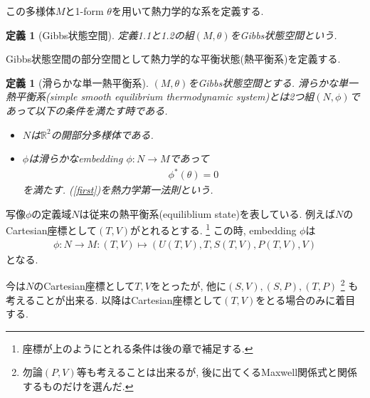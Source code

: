 \documentclass[a4paper,12pt]{ltjsarticle}
\theoremstyle{break}
\newtheorem{defn}[thm]{定義}
\newcommand{\mbr}{\mathbb{R}}
\newcommand{\mt}{\mapsto}
\numberwithin{equation}{section}
\begin{document}
この多様体$M$と1-form $\theta$を用いて熱力学的な系を定義する. 

\begin{defn}[Gibbs状態空間]
  定義1.1と1.2の組$(M,\theta)$をGibbs状態空間という. 
\end{defn}

Gibbs状態空間の部分空間として熱力学的な平衡状態(熱平衡系)を定義する. 

\begin{defn}[滑らかな単一熱平衡系]
  $(M,\theta)$をGibbs状態空間とする. 
  滑らかな単一熱平衡系(simple smooth equilibrium thermodynamic system)とは2つ組$(N,\phi)$であって以下の条件を満たす時である. 
  \begin{itemize}
    \item $N$は$\mbr^2$の開部分多様体である. 
    \item $\phi$は滑らかなembedding $\phi: N \to M$であって
     \begin{align}
      \label{first}
      \phi^*(\theta)
      = 0
     \end{align}
    を満たす. 
    (\ref{first})を熱力学第一法則という. 
  \end{itemize}
\end{defn}


写像$\phi$の定義域$N$は従来の熱平衡系(equiliblium state)を表している. 
例えば$N$のCartesian座標として$(T,V)$がとれるとする. 
\footnote{
  座標が上のようにとれる条件は後の章で補足する. 
}
この時, embedding $\phi$は
\begin{align*}
  \phi: N \to M: (T,V) \mt (U(T,V), T, S(T,V), P(T,V), V)
\end{align*}
となる. 

今は$N$のCartesian座標として$T,V$をとったが, 他に$(S,V), (S,P), (T,P)$ 
\footnote{
  勿論$(P,V)$等も考えることは出来るが, 後に出てくるMaxwell関係式と関係するものだけを選んだ. 
}
も考えることが出来る. 
以降はCartesian座標として$(T,V)$をとる場合のみに着目する.
\end{document}
